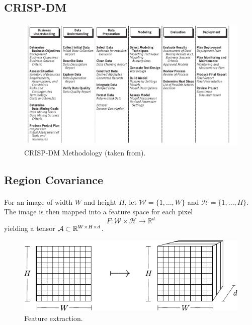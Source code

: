 \documentclass{beamer}
\theoremstyle{definition}
\theoremstyle{remark}
\theoremstyle{example}
\newif\ifinsection
\newif\ifinsubsection
\let\oldsubsection\subsection
\renewcommand{\subsection}{
  \global\insubsectiontrue
  \oldsubsection}
\newcommand {\aframe}[1] {
  \begin{frame}
    \ifinsection\frametitle{\secname}\fi
    \ifinsubsection\framesubtitle{\subsecname}\fi
  #1
  \end{frame}
}
\begin{document}
\subsection{CRISP-DM}
\aframe{
  \begin{figure}[H]
    \centering \includegraphics[width = \linewidth]{figs/crisp-dm.png}
    \caption{CRISP-DM Methodology (taken from\cite{Chapman2000CRISPDM1S}).}
  \end{figure}
}

\subsection{Region Covariance}
\aframe{ For an image of width $W$ and height $H$, let
  $\mathcal{W}=\{1,\ldots,W\}$ and $\mathcal{H}=\{1,\ldots,H\}$. The image is
  then mapped into a feature space for each pixel
  \[
    F:\mathcal{W}\times\mathcal{H}\rightarrow\mathbb{R}^{d}
  \]
  yielding a tensor $\mathcal{A} \subset {\mathbb{R}}^{W \times H \times d}$.
  \begin{figure}[H]
    \centering \includegraphics[width =
    0.9\linewidth]{figs/feature_extraction.pdf}
    \caption{Feature extraction.}
  \end{figure}
}
\end{document}

